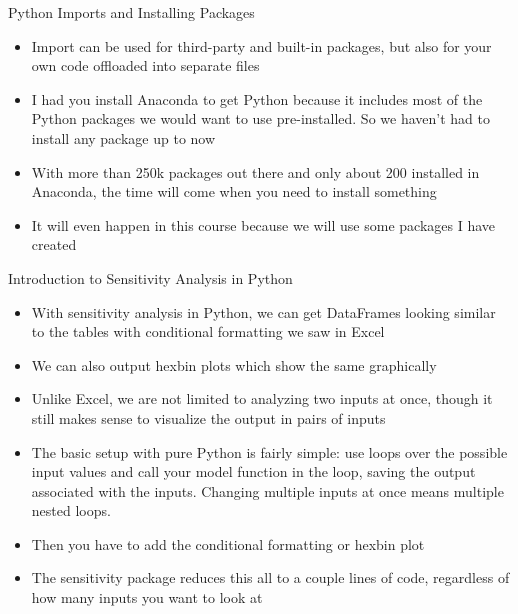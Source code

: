 \documentclass[]{article}
\begin{document}
\begin{section}{Python Imports and Installing Packages}
\begin{itemize}
\item Import can be used for third-party and built-in packages, but also for your own code offloaded into separate files
\item I had you install Anaconda to get Python because it includes most of the Python packages we would want to use pre-installed. So we haven't had to install any package up to now
\item With more than 250k packages out there and only about 200 installed in Anaconda, the time will come when you need to install something
\item It will even happen in this course because we will use some packages I have created
\end{itemize}
\end{section}
\begin{section}{Introduction to Sensitivity Analysis in Python}
\begin{itemize}
\item With sensitivity analysis in Python, we can get DataFrames looking similar to the tables with conditional formatting we saw in Excel
\item We can also output hexbin plots which show the same graphically
\item Unlike Excel, we are not limited to analyzing two inputs at once, though it still makes sense to visualize the output in pairs of inputs
\item The basic setup with pure Python is fairly simple: use loops over the possible input values and call your model function in the loop, saving the output associated with the inputs. Changing multiple inputs at once means multiple nested loops.
\item Then you have to add the conditional formatting or hexbin plot
\item The sensitivity package reduces this all to a couple lines of code, regardless of how many inputs you want to look at
\end{itemize}
\end{section}
\end{document}
